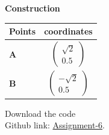 \documentclass[10pt,a4paper]{report}
\newcommand{\myvec}[1]{\ensuremath{\begin{pmatrix}#1\end{pmatrix}}}
\let\vec\mathbf
\let\vec\mathbf
\begin{document}
\begin{multicols}{2}
 \vspace{2mm} \textbf{Construction}
\begin{center}
\setlength{\arrayrulewidth}{0.5mm}
\setlength{\tabcolsep}{6pt}
\renewcommand{\arraystretch}{1.5}
    \begin{tabular}{|l|c|}
    \hline 
    \textbf{Points} & \textbf{coordinates} \\ \hline
   $\vec{A}$ & $\myvec{
   \sqrt{2}\\
   0.5
   } $ \\\hline
   $\vec{B}$ & $\myvec{
   -\sqrt{2}\\
   0.5
   } $ \\\hline
      \end{tabular}
  \end{center}

\raggedright  Download the code \\
Github link: \href{https://github.com/chiragshah1244/FWC/blob/main/assignments/assignment_6/code_conic/conic.py}{Assignment-6}.
  \end{multicols}
\end{document}
